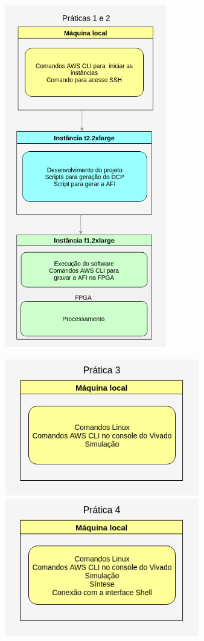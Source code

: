 \begin{figure}[h!]
\begin{minipage}{0.48\columnwidth}
\includegraphics[width=\columnwidth,height=150mm]{figuras/Praticas1e2.png}
\end{minipage}
\begin{minipage}{0.48\columnwidth}
\includegraphics[width=\columnwidth,height=6cm]{figuras/pratica3.png}
\\[5mm]
\includegraphics[width=\columnwidth,height=6cm]{figuras/pratica4.png}
\end{minipage}
\end{figure}




